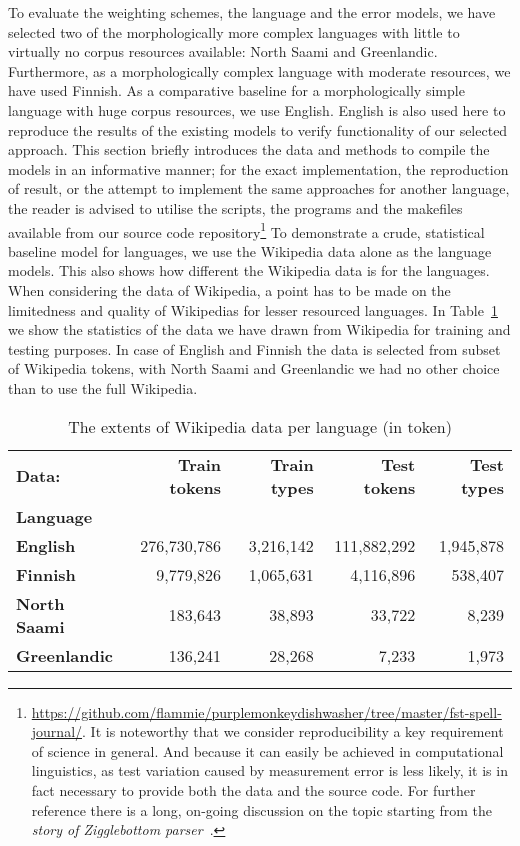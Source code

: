 \documentclass[a4paper,12pt]{article}
\begin{document}
To evaluate the weighting schemes, the language and the error models, we have
selected two of the morphologically more complex languages with little to
virtually no corpus resources available: North Saami and Greenlandic.
Furthermore, as a morphologically complex language with moderate resources, we have
used Finnish. As a comparative baseline for a morphologically simple language
with huge corpus resources, we use English. English is also used here to
reproduce the results of the existing models to verify functionality of our
selected approach. This section briefly introduces the data and methods to
compile the models in an informative manner; for the exact implementation, the
reproduction of result, or the attempt to implement the same approaches for
another language, the reader is advised to utilise the scripts, the programs
and the makefiles available from our source code
repository\footnote{\url{https://github.com/flammie/purplemonkeydishwasher/tree/master/fst-spell-journal/}.
    It is noteworthy that we consider reproducibility a key requirement of
    science in general. And because it can easily be achieved in computational
    linguistics, as test variation caused by measurement error is less
    likely, it is in fact necessary to provide both the data and the source
    code. For further reference there is
    a long, on-going discussion on the topic starting from
the \emph{story of Zigglebottom
parser}~\cite[]{pedersen2008empiricism,fokkensoffspring}.} To demonstrate a
crude, statistical baseline model for languages, we use the Wikipedia data
alone as the language models. This also shows how different the Wikipedia data
is for the languages. When considering the data of Wikipedia, a point has to
be made on the limitedness and quality of Wikipedias for lesser resourced
languages. In Table~\ref{table:wikipedia-data} we show the statistics of the
data we have drawn from Wikipedia for training and testing purposes. In case of
English and Finnish the data is selected from subset of Wikipedia tokens, with
North Saami and Greenlandic we had no other choice than to use the full
Wikipedia.

\begin{table}
    \centering
    \begin{tabular}{|l|r|r|r|r|}
        \hline
        \bf Data: & \bf Train tokens & \bf Train types & \bf Test tokens & \bf Test types \\
        \bf Language & & & & \\
        \hline
        \bf English & 276,730,786 & 3,216,142 & 111,882,292 & 1,945,878 \\
        \hline
        \bf Finnish & 9,779,826 & 1,065,631 & 4,116,896 & 538,407 \\
        \hline
        \bf North Saami & 183,643 & 38,893 & 33,722 & 8,239 \\
        \hline
        \bf Greenlandic & 136,241 & 28,268 & 7,233 & 1,973 \\
        \hline
    \end{tabular}
    \caption{The extents of Wikipedia data per language (in token)
    \label{table:wikipedia-data}}
\end{table}
\end{document}
